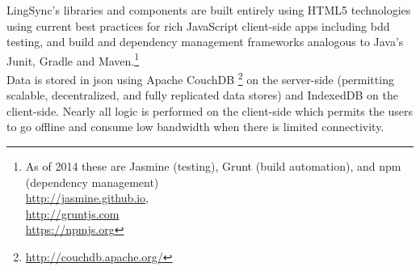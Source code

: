 \documentclass[11pt]{article}
\newcommand{\smalltodo}[2][]
    {\todo[caption={#2}, #1]
    {\tiny#2\normalsize}}
\begin{document}

LingSync's libraries and components are built entirely using HTML5 technologies
using current best practices for rich JavaScript client-side apps including
\gls{bdd} testing, and build and dependency management frameworks analogous to
Java's Junit, Gradle and Maven.\footnote{As of 2014 these are Jasmine (testing), Grunt (build automation), and \gls{npm} (dependency management)\\
\url{http://jasmine.github.io}, \\
\url{http://gruntjs.com} \\
\url{https://npmjs.org}}\\
Data is stored in \gls{json} using Apache CouchDB%
\footnote{\url{http://couchdb.apache.org/}} %
on the server-side (permitting scalable, decentralized, and fully replicated data
stores) and IndexedDB on the client-side. Nearly all logic is performed on the
client-side which permits the users to go offline and consume low bandwidth
when there is limited connectivity.
\end{document}
